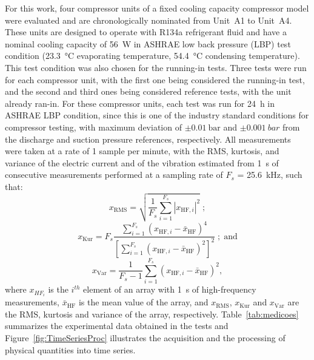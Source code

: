 \documentclass[preprint,11pt,number]{elsarticle}
\begin{document}
For this work, four compressor units of a fixed cooling capacity compressor model were evaluated and are chronologically nominated from Unit~A1 to Unit~A4. These units are designed to operate with R134a refrigerant fluid and have a nominal cooling capacity of \SI{56}{\watt} in ASHRAE low back pressure (LBP) test condition (\SI{23.3}{\celsius} evaporating temperature, \SI{54.4}{\celsius} condensing temperature). This test condition was also chosen for the running-in tests.
Three tests were run for each compressor unit, with the first one being considered the running-in test, and the second and third ones being considered reference tests, with the unit already ran-in. For these compressor units, each test was run for \SI{24}{\hour} in ASHRAE LBP condition, since this is one of the industry standard conditions for compressor testing, with maximum deviation of $\pm\SI{0.01}{\bar}$ and $\pm\SI{0.001}{bar}$ from the discharge and suction pressure references, respectively. All measurements were taken at a rate of 1 sample per minute, with the RMS, kurtosis, and variance of the electric current and of the vibration estimated from \SI{1}{\second} of consecutive measurements performed at a sampling rate of $F_s$ = \SI{25.6}{\kilo\hertz}, such that:
\begin{equation*}
    x_{\text{RMS}}=\sqrt{\frac{1}{F_s}\sum_{i=1}^{F_s}|x_{\text{HF},i}|^2}\; ;
\end{equation*}
\begin{equation*}
    x_{\text{Kur}}=F_s\frac{\sum\limits_{i=1}^{F_s}(x_{\text{HF},i}-\bar{x}_{\text{HF}})^4}{\left[ \sum\limits_{i=1}^{F_s}(x_{\text{HF},i}-\bar{x}_{\text{HF}})^2 \right]^2}\; ;\; \text{and}
\end{equation*}
\begin{equation*}
    x_{\text{Var}}=\frac{1}{F_s-1}\sum\limits_{i=1}^{F_s}(x_{\text{HF},i}-\bar{x}_{\text{HF}})^2,
\end{equation*}
where $x_{HF_i}$ is the $i^{th}$ element of an array with \SI{1}{\second} of high-frequency measurements, $\bar{x}_{\text{HF}}$ is the mean value of the array, and $x_{\text{RMS}}$, $x_{\text{Kur}}$ and $x_{\text{Var}}$ are the RMS, kurtosis and variance of the array, respectively. Table~\ref{tab:medicoes} summarizes the experimental data obtained in the tests and Figure~\ref{fig:TimeSeriesProc} illustrates the acquisition and the processing of physical quantities into time series.
\end{document}
